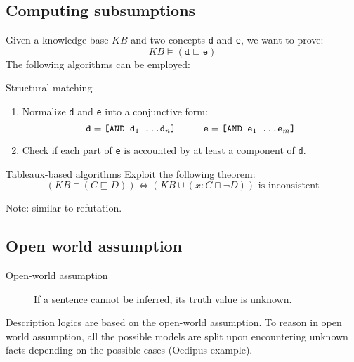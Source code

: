 \subsection{Computing subsumptions}

Given a knowledge base $KB$ and two concepts \texttt{d} and \texttt{e},
we want to prove:
\[ KB \models (\texttt{d} \sqsubseteq \texttt{e}) \]
The following algorithms can be employed:
\begin{descriptionlist}
    \item[Structural matching] 
        \phantom{}
        \begin{enumerate}
            \item Normalize \texttt{d} and \texttt{e} into a conjunctive form:
                \[ \texttt{d} = \texttt{[AND d$_1$ \dots d$_n$]} \hspace*{1cm} \texttt{e} = \texttt{[AND e$_1$ \dots e$_m$]} \]
            \item Check if each part of \texttt{e} is accounted by at least a component of \texttt{d}.
        \end{enumerate}
        
    \item[Tableaux-based algorithms] 
        Exploit the following theorem:
        \[ (KB \models (C \sqsubseteq D)) \iff (KB \cup (x : C \sqcap \lnot D)) \text{ is inconsistent} \]

        Note: similar to refutation.
\end{descriptionlist}


\subsection{Open world assumption}

\begin{description}
    \item[Open-world assumption] 
        If a sentence cannot be inferred, its truth value is unknown.
\end{description}

Description logics are based on the open-world assumption.
To reason in open world assumption, all the possible models are split upon encountering unknown facts
depending on the possible cases (Oedipus example).



